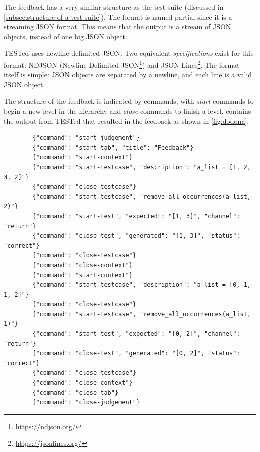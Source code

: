 \documentclass[../main]{subfiles}
\begin{document}
The feedback has a very similar structure as the test suite (discussed in \cref{subsec:structure-of-a-test-suite}).
The format is named partial since it is a streaming JSON format.
This means that the output is a stream of JSON objects, instead of one big JSON object.


TESTed uses newline-delimited JSON\@.
Two equivalent \emph{specifications} exist for this format: NDJSON (Newline-Delimited JSON\footnote{\url{https://ndjson.org/}}) and JSON Lines\footnote{\url{https://jsonlines.org/}}.
The format itself is simple: JSON objects are separated by a newline, and each line is a valid JSON object.

The structure of the feedback is indicated by commands, with \emph{start} commands to begin a new level in the hierarchy and \emph{close} commands to finish a level.
 contains the output from TESTed that resulted in the feedback as shown in \cref{fig:dodona}.

\begin{listing}
    \begin{verbatim}
        {"command": "start-judgement"}
        {"command": "start-tab", "title": "Feedback"}
        {"command": "start-context"}
        {"command": "start-testcase", "description": "a_list = [1, 2, 3, 2]"}
        {"command": "close-testcase"}
        {"command": "start-testcase", "remove_all_occurrences(a_list, 2)"}
        {"command": "start-test", "expected": "[1, 3]", "channel": "return"}
        {"command": "close-test", "generated": "[1, 3]", "status": "correct"}
        {"command": "close-testcase"}
        {"command": "close-context"}
        {"command": "start-context"}
        {"command": "start-testcase", "description": "a_list = [0, 1, 1, 2]"}
        {"command": "close-testcase"}
        {"command": "start-testcase", "remove_all_occurrences(a_list, 1)"}
        {"command": "start-test", "expected": "[0, 2]", "channel": "return"}
        {"command": "close-test", "generated": "[0, 2]", "status": "correct"}
        {"command": "close-testcase"}
        {"command": "close-context"}
        {"command": "close-tab"}
        {"command": "close-judgement"}
    \end{verbatim}
    \caption{
        Example of the output generated by TESTed, which is rendered in \cref{fig:dodona}.
        As before, each context consists of two testcases, the first of which has no tests, while the second has one test (the expected return value).
    }
    \label{lst:tested-output-example}
\end{listing}
\end{document}
